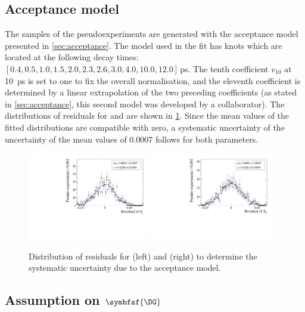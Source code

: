 \subsection*{Acceptance model}

The samples of the pseudoexperiments are generated with the acceptance model presented in \cref{sec:acceptance}.
The model used in the fit has knots which are located at the following decay times: $[0.4, 0.5, 1.0, 1.5, 2.0, 2.3, 2.6, 3.0, 4.0, 10.0, 12.0]\,$\si{\pico\second}.
The tenth coefficient $v_{10}$ at \SI{10}{\pico\second} is set to one to fix the overall normalisation, and the eleventh coefficient is determined by a linear extrapolation of the two preceding coefficients (as stated in \cref{sec:acceptance}, this second model was developed by a collaborator).
The distributions of residuals for \Sf and \Sfbar are shown in \cref{fig:systUncertAcc}.
Since the mean values of the fitted distributions are compatible with zero, a systematic uncertainty of the uncertainty of the mean values of  \num{0.0007} follows for both \CP parameters.
\begin{figure}[tbp]
    \centering
    \includegraphics[width=0.48\textwidth]{10Systematics/figs/accept_Sf_res.pdf}
    \includegraphics[width=0.48\textwidth]{10Systematics/figs/accept_Sfbar_res.pdf}
    \caption{Distribution of residuals for \Sf (left) and \Sfbar (right) to determine the systematic uncertainty due to the acceptance model.}
    \label{fig:systUncertAcc}
\end{figure}

\subsection*{Assumption on $\symbfsf{\DG}$}

